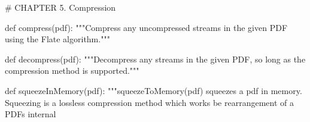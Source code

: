 # CHAPTER 5. Compression

def compress(pdf):
    """Compress any uncompressed streams in the given PDF using the Flate
    algorithm."""

def decompress(pdf):
    """Decompress any streams in the given PDF, so long as the compression
    method is supported."""

def squeezeInMemory(pdf):
    """squeezeToMemory(pdf) squeezes a pdf in memory. Squeezing is a lossless
    compression method which works be rearrangement of a PDFs internal

